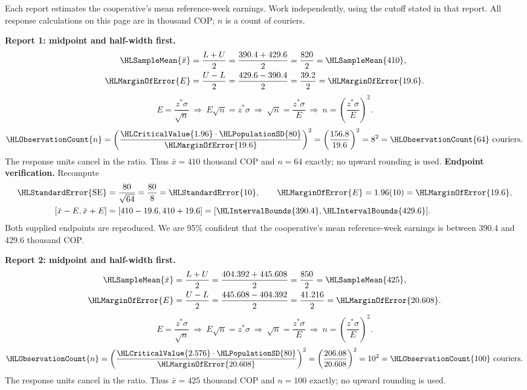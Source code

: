 Each report estimates the cooperative's mean reference-week earnings. Work independently, using the cutoff stated in that report. All response calculations on this page are in thousand COP; $n$ is a count of couriers.
\par\noindent\textbf{Report 1: midpoint and half-width first.}
\[\begin{aligned}
\HLSampleMean{\bar x}&=\frac{L+U}{2}=\frac{390.4+429.6}{2}=\frac{820}{2}=\HLSampleMean{410},\\
\HLMarginOfError{E}&=\frac{U-L}{2}=\frac{429.6-390.4}{2}=\frac{39.2}{2}=\HLMarginOfError{19.6}.
\end{aligned}\]
\[E=\frac{z^*\sigma}{\sqrt n}\ \Longrightarrow\ E\sqrt n=z^*\sigma\ \Longrightarrow\ \sqrt n=\frac{z^*\sigma}{E}\ \Longrightarrow\ n=\left(\frac{z^*\sigma}{E}\right)^2.\]
\[\HLObservationCount{n}=\left(\frac{\HLCriticalValue{1.96}\cdot\HLPopulationSD{80}}{\HLMarginOfError{19.6}}\right)^2=\left(\frac{156.8}{19.6}\right)^2=8^2=\HLObservationCount{64}\text{ couriers}.\]
The response units cancel in the ratio. Thus $\bar x=410$ thousand COP and $n=64$ exactly; no upward rounding is used.
\textbf{Endpoint verification.} Recompute
\[\begin{aligned}
\HLStandardError{\mathrm{SE}}&=\frac{80}{\sqrt{64}}=\frac{80}{8}=\HLStandardError{10},\qquad \HLMarginOfError{E}=1.96(10)=\HLMarginOfError{19.6},\\
[\bar x-E,\bar x+E]&=[410-19.6,410+19.6]=[\HLIntervalBounds{390.4},\HLIntervalBounds{429.6}].
\end{aligned}\]
Both supplied endpoints are reproduced. We are 95\% confident that the cooperative's mean reference-week earnings is between 390.4 and 429.6 thousand COP.
\clearpage
\par\noindent\textbf{Report 2: midpoint and half-width first.}
\[\begin{aligned}
\HLSampleMean{\bar x}&=\frac{L+U}{2}=\frac{404.392+445.608}{2}=\frac{850}{2}=\HLSampleMean{425},\\
\HLMarginOfError{E}&=\frac{U-L}{2}=\frac{445.608-404.392}{2}=\frac{41.216}{2}=\HLMarginOfError{20.608}.
\end{aligned}\]
\[E=\frac{z^*\sigma}{\sqrt n}\ \Longrightarrow\ E\sqrt n=z^*\sigma\ \Longrightarrow\ \sqrt n=\frac{z^*\sigma}{E}\ \Longrightarrow\ n=\left(\frac{z^*\sigma}{E}\right)^2.\]
\[\HLObservationCount{n}=\left(\frac{\HLCriticalValue{2.576}\cdot\HLPopulationSD{80}}{\HLMarginOfError{20.608}}\right)^2=\left(\frac{206.08}{20.608}\right)^2=10^2=\HLObservationCount{100}\text{ couriers}.\]
The response units cancel in the ratio. Thus $\bar x=425$ thousand COP and $n=100$ exactly; no upward rounding is used.
